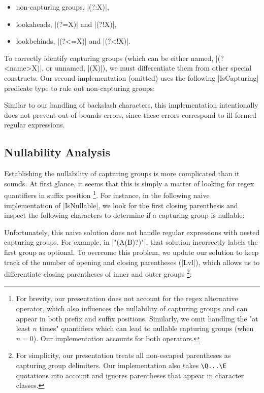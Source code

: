 \begin{itemize}
  \item non-capturing groups, |(?:X)|,
  \item lookaheads, |(?=X)| and |(?!X)|,
  \item lookbehinds, |(?<=X)| and |(?<!X)|.
\end{itemize}

\noindent
To correctly identify capturing groups (which can be either named, |(?<name>X)|, or unnamed, |(X)|), we must differentiate them from other special constructs.
Our second implementation (omitted) uses the following |IsCapturing| predicate type to rule out non-capturing groups:

\regexIsCapturing

\noindent
Similar to our handling of backslash characters, this implementation intentionally does not prevent out-of-bounds errors, since these errors correspond to ill-formed regular expressions.

\subsection{Nullability Analysis}

Establishing the nullability of capturing groups is more complicated than it sounds.
At first glance, it seems that this is simply a matter of looking for regex quantifiers in suffix position%
\footnote{
For brevity, our presentation does not account for the regex alternative operator, which also influences the nullability of capturing groups and can appear in both prefix and suffix positions.
Similarly, we omit handling the "at least $n$ times" quantifiers which can lead to nullable capturing groups (when $n=0$).
Our implementation accounts for both operators.
}.
For instance, in the following naive implementation of |IsNullable|, we look for the first closing parenthesis and inspect the following characters to determine if a capturing group is nullable:

\regexNaiveIsNullable

\noindent
Unfortunately, this naive solution does not handle regular expressions with nested capturing groups.
For example, in |"(A(B)?)"|, that solution incorrectly labels the first group as optional.
To overcome this problem, we update our solution to keep track of the number of opening and closing parentheses (|Lvl|), which allows us to differentiate closing parentheses of inner and outer groups%
\footnote{
For simplicity, our presentation treats all non-escaped parentheses as capturing group delimiters.
Our implementation also takes \texttt{\textbackslash{}Q...\textbackslash{}E} quotations into account and ignores parentheses that appear in character classes.
}:

